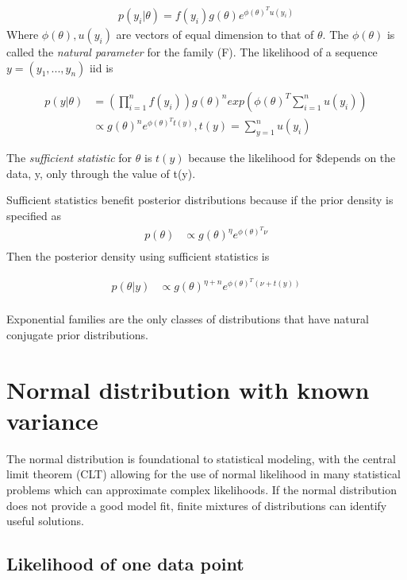 \documentclass[
]{book}
\theoremstyle{definition}
\theoremstyle{definition}
\theoremstyle{definition}
\theoremstyle{definition}
\theoremstyle{remark}
\begin{document}
\[
\begin{aligned}
 p(y_i | \theta)=f(y_i)g(\theta)e^{\phi(\theta)^Tu(y_i)}
\end{aligned}
\]
Where \(\phi(\theta), u(y_i)\) are vectors of equal dimension to that of \(\theta\). The \(\phi(\theta)\) is called the \emph{natural parameter} for the family (F). The likelihood of a sequence \(y=(y_1,...,y_n)\) iid is

\[
\begin{aligned}
 p(y | \theta)&= (\prod_{i=1}^n f(y_i)) g(\theta)^n exp(\phi(\theta)^T \sum_{i=1}^n u(y_i)) \\
  &\propto g(\theta)^ne^{\phi(\theta)^Tt(y)}, t(y)=\sum_{y=1}^n u(y_i)
\end{aligned}
\]

The \emph{sufficient statistic} for \(\theta\) is \(t(y)\) because the likelihood for \$\theta depends on the data, y, only through the value of t(y).

Sufficient statistics benefit posterior distributions because if the prior density is specified as
\[
\begin{aligned}
 p(\theta)&\propto g(\theta)^{\eta} e^{\phi(\theta)^T \nu} \\
 \end{aligned}
\]
Then the posterior density using sufficient statistics is

\[
\begin{aligned}
 p(\theta | y ) &\propto g(\theta)^{\eta+n} e^{\phi(\theta)^T (\nu+t(y))} \\
 \end{aligned}
\]

Exponential families are the only classes of distributions that have natural conjugate prior distributions.

\hypertarget{normal-distribution-with-known-variance}{%
\section{Normal distribution with known variance}\label{normal-distribution-with-known-variance}}

The normal distribution is foundational to statistical modeling, with the central limit theorem (CLT) allowing for the use of normal likelihood in many statistical problems which can approximate complex likelihoods. If the normal distribution does not provide a good model fit, finite mixtures of distributions can identify useful solutions.

\hypertarget{likelihood-of-one-data-point}{%
\subsection*{Likelihood of one data point}\label{likelihood-of-one-data-point}}
\end{document}
